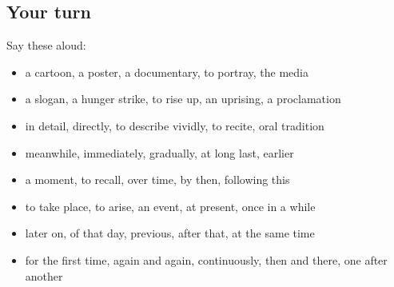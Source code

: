 \subsection*{Your turn}
Say these aloud:

\begin{itemize}
\raggedright
  \item a cartoon, a poster, a documentary, to portray, the media
  \item a slogan, a hunger strike, to rise up, an uprising, a proclamation
  \item in detail, directly, to describe vividly, to recite, oral tradition
  \item meanwhile, immediately, gradually, at long last, earlier
  \item a moment, to recall, over time, by then, following this
  \item to take place, to arise, an event, at present, once in a while
  \item later on, of that day, previous, after that, at the same time
  \item for the first time, again and again, continuously, then and there, one after another
\end{itemize}

